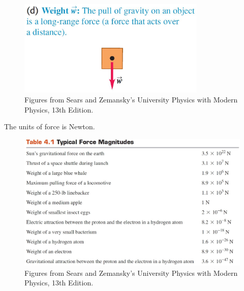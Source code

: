 \documentclass[]{beamer}
\begin{document}
  


    



\begin{frame}

    \begin{figure}[h!]  
        \includegraphics[width=0.8\textwidth]{images/f4.jpg}
        \caption{ {\tiny Figures from Sears and Zemansky's University Physics 
        with Modern Physics, 13th Edition.} }
      \end{figure}
  


    
    
    \end{frame}







\begin{frame}

The units of force is  Newton.    
 
    
 

\begin{figure}[h!]  
  \includegraphics[width=1.\textwidth]{images/f5.jpg}
  \caption{ {\tiny Figures from Sears and Zemansky's University Physics 
  with Modern Physics, 13th Edition.} }
\end{figure}


 

    
    
    \end{frame}
\end{document}
